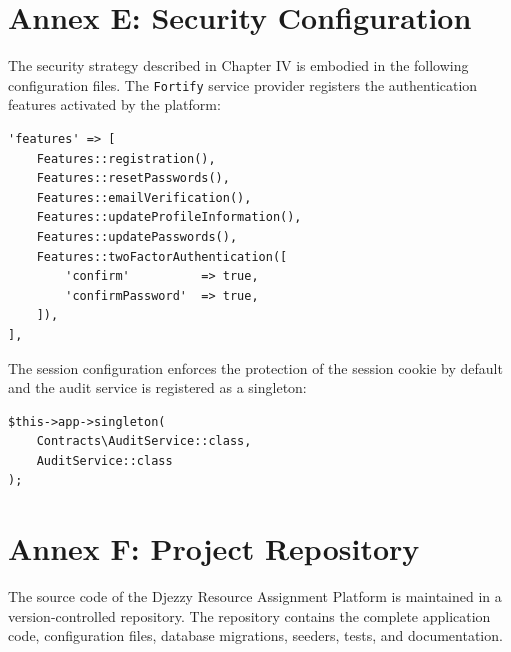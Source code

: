 \documentclass{bts-report}
\begin{document}
\section*{Annex E: Security Configuration}
The security strategy described in Chapter IV is embodied in the following configuration files. The \texttt{Fortify} service provider registers the authentication features activated by the platform:
\begin{verbatim}
'features' => [
    Features::registration(),
    Features::resetPasswords(),
    Features::emailVerification(),
    Features::updateProfileInformation(),
    Features::updatePasswords(),
    Features::twoFactorAuthentication([
        'confirm'          => true,
        'confirmPassword'  => true,
    ]),
],
\end{verbatim}

The session configuration enforces the protection of the session cookie by default and the audit service is registered as a singleton:
\begin{verbatim}
$this->app->singleton(
    Contracts\AuditService::class,
    AuditService::class
);
\end{verbatim}

\section*{Annex F: Project Repository}
The source code of the Djezzy Resource Assignment Platform is maintained in a version-controlled repository. The repository contains the complete application code, configuration files, database migrations, seeders, tests, and documentation.
\end{document}
